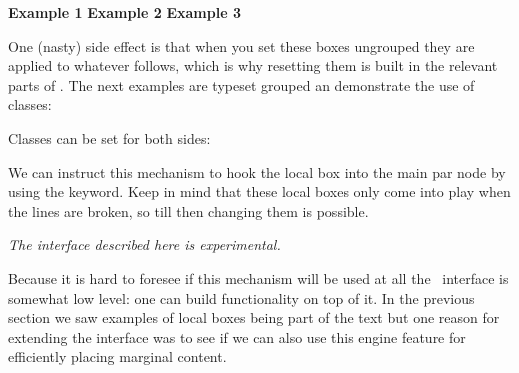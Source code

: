 \typebuffer[example-3][option=TEX]

\startplacefigure %
    \startcombination[nx=1,ny=3]
        {\vbox{\hsize\textwidth\getbuffer[example-1]}} {\bf Example 1}
        {\vbox{\hsize\textwidth\getbuffer[example-2]}} {\bf Example 2}
        {\vbox{\hsize\textwidth\getbuffer[example-3]}} {\bf Example 3}
    \stopcombination
\stopplacefigure

One (nasty) side effect is that when you set these boxes ungrouped they are
applied to whatever follows, which is why resetting them is built in the relevant
parts of \CONTEXT. The next examples are typeset grouped an demonstrate the use
of classes:

\startbuffer
{}
%
%
\stopbuffer

\typebuffer[option=TEX] \start \getbuffer \par \stop

Classes can be set for both sides:

\startbuffer
{}%
%
\stopbuffer

\typebuffer[option=TEX] \start \getbuffer \par \stop

We can instruct this mechanism to hook the local box into the main
par node by using the  keyword. Keep in mind that these
local boxes only come into play when the lines are broken, so till
then changing them is possible.

\startbuffer
{}%
%
\stopbuffer

\typebuffer[option=TEX] \start \getbuffer \par \stop

\stopsectionlevel

\startsectionlevel[title=The interface]

{\em The interface described here is experimental.}

Because it is hard to foresee if this mechanism will be used at all the \CONTEXT\
interface is somewhat low level: one can build functionality on top of it. In the
previous section we saw examples of local boxes being part of the text but one
reason for extending the interface was to see if we can also use this engine
feature for efficiently placing marginal content.

